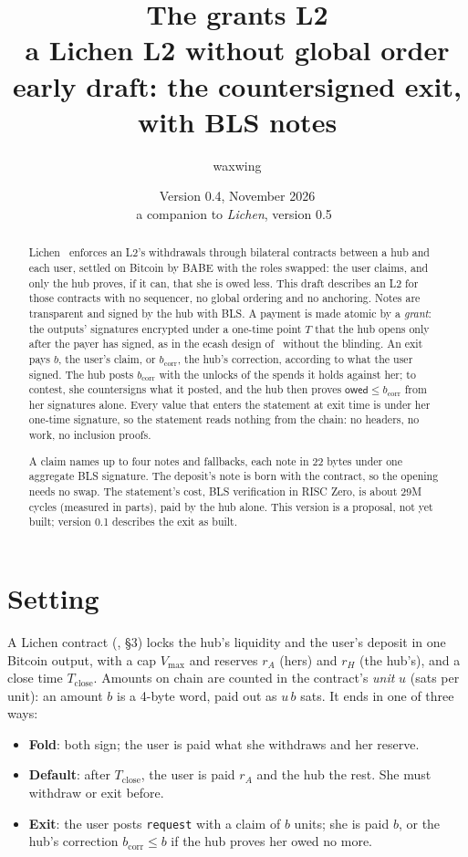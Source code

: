 \documentclass[11pt]{article}
\title{\textbf{The grants L2}\\a Lichen L2 without global order\\[2pt]\large early draft: the countersigned exit, with BLS notes}
\author{waxwing}
\date{Version 0.4, November 2026\\[2pt]\small a companion to \emph{Lichen}, version 0.5~\cite{lichen}}
\theoremstyle{plain}
\theoremstyle{definition}
\newcommand{\vmax}{V_{\max}}
\newcommand{\Tc}{T_{\mathrm{close}}}
\newcommand{\bcorr}{b_{\mathrm{corr}}}
\newcommand{\tx}[1]{\texttt{#1}}
\newcommand{\owed}{\mathsf{owed}}
\begin{document}
\maketitle

\begin{abstract}
Lichen~\cite{lichen} enforces an L2's withdrawals through bilateral
contracts between a hub and each user, settled on Bitcoin by BABE with
the roles swapped: the user claims, and only the hub proves, if it can,
that she is owed less. This draft describes an L2 for those contracts
with no sequencer, no global ordering and no anchoring. Notes are
transparent and signed by the hub with BLS. A payment is made atomic
by a \emph{grant}: the outputs' signatures encrypted under a one-time
point $T$ that the hub opens only after the payer has signed, as in
the ecash design of~\cite{ecash} without the blinding. An exit pays
$b$, the user's claim, or $\bcorr$, the hub's correction, according to
what the user signed. The hub posts $\bcorr$ with the unlocks of the
spends it holds against her; to contest, she countersigns what it
posted, and the hub then proves $\owed \le \bcorr$ from her signatures
alone. Every value that enters the statement at exit time is under her
one-time signature, so the statement reads nothing from the chain: no
headers, no work, no inclusion proofs.

A claim names up to four notes and fallbacks, each note in 22 bytes
under one aggregate BLS signature. The deposit's note is born with the
contract, so the opening needs no swap. The statement's cost, BLS
verification in RISC Zero, is about 29M cycles (measured in parts),
paid by the hub alone. This version is a proposal, not yet built;
version 0.1 describes the exit as built.
\end{abstract}

\tableofcontents

\section{Setting}

A Lichen contract (\cite{lichen}, \S3) locks the hub's liquidity and the
user's deposit in one Bitcoin output, with a cap $\vmax$ and reserves
$r_A$ (hers) and $r_H$ (the hub's), and a close time $\Tc$. Amounts on
chain are counted in the contract's \emph{unit} $u$ (sats per unit): an
amount $b$ is a 4-byte word, paid out as $u\,b$ sats. It ends in one of
three ways:
\begin{itemize}[nosep]
\item \textbf{Fold}: both sign; the user is paid what she withdraws and
  her reserve.
\item \textbf{Default}: after $\Tc$, the user is paid $r_A$ and the hub
  the rest. She must withdraw or exit before.
\item \textbf{Exit}: the user posts \tx{request} with a claim of $b$
  units; she is paid $b$, or the hub's correction $\bcorr \le b$ if the
  hub proves her owed no more.
\end{itemize}
\end{document}
